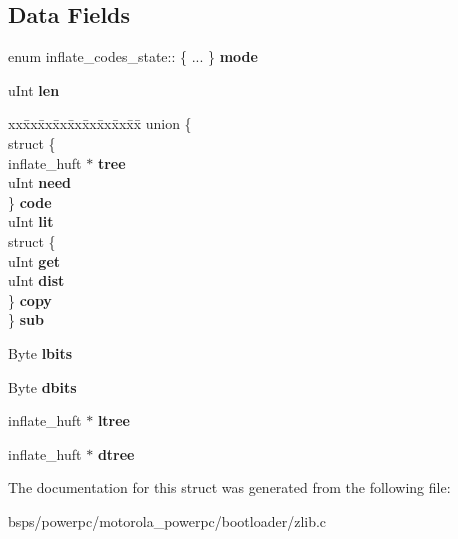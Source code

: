 \subsection*{Data Fields}
\begin{DoxyCompactItemize}
\item 
\mbox{\label{structinflate__codes__state_ac5a2be8f2c3a2ee2643d3b487e9df045}} 
enum inflate\+\_\+codes\+\_\+state\+:: \{ ... \}  {\bfseries mode}
\item 
\mbox{\label{structinflate__codes__state_a587855c033e7a4d2bae6db2d063911d1}} 
u\+Int {\bfseries len}
\item 
\mbox{\label{structinflate__codes__state_a46a947bd5d7d681eebcdb6635bfb75ed}} 
\begin{tabbing}
xx\=xx\=xx\=xx\=xx\=xx\=xx\=xx\=xx\=\kill
union \{\\
\>struct \{\\
\>\>inflate\_huft $\ast$ {\bfseries tree}\\
\>\>uInt {\bfseries need}\\
\>\} {\bfseries code}\\
\>uInt {\bfseries lit}\\
\>struct \{\\
\>\>uInt {\bfseries get}\\
\>\>uInt {\bfseries dist}\\
\>\} {\bfseries copy}\\
\} {\bfseries sub}\\

\end{tabbing}\item 
\mbox{\label{structinflate__codes__state_a3962907dadd1f3ff9bcaae5810676c14}} 
Byte {\bfseries lbits}
\item 
\mbox{\label{structinflate__codes__state_a31889987198fbd60c57005306adabb46}} 
Byte {\bfseries dbits}
\item 
\mbox{\label{structinflate__codes__state_abf443b09dacdf4061524b0556c3932dd}} 
inflate\+\_\+huft $\ast$ {\bfseries ltree}
\item 
\mbox{\label{structinflate__codes__state_ac0b2b7ff52166b8facf9e2551a14ee46}} 
inflate\+\_\+huft $\ast$ {\bfseries dtree}
\end{DoxyCompactItemize}


The documentation for this struct was generated from the following file\+:\begin{DoxyCompactItemize}
\item 
bsps/powerpc/motorola\+\_\+powerpc/bootloader/zlib.\+c\end{DoxyCompactItemize}
